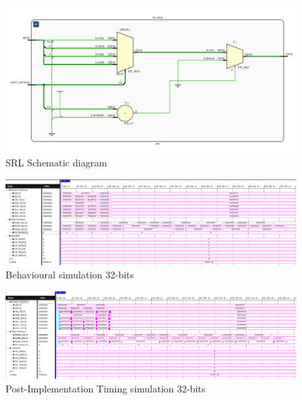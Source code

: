 \documentclass[CMPE]{../KGCOEReport}
\begin{document}
    \begin{figure}[h!]
        \centering
        \includegraphics[width=\textwidth]{img/srl_schem}
        \caption{SRL Schematic diagram}
        \label{fig:demo6}
    \end{figure}
    \begin{figure}[h!]
        \centering
        \includegraphics[width=\textwidth]{img/behaviour_32}
        \caption{Behavioural simulation 32-bits}
        \label{fig:demo7}
    \end{figure}
    \begin{figure}[h!]
        \centering
        \includegraphics[width=\textwidth]{img/timing_32}
        \caption{Post-Implementation Timing simulation 32-bits}
        \label{fig:demo8}
    \end{figure}
\end{document}
